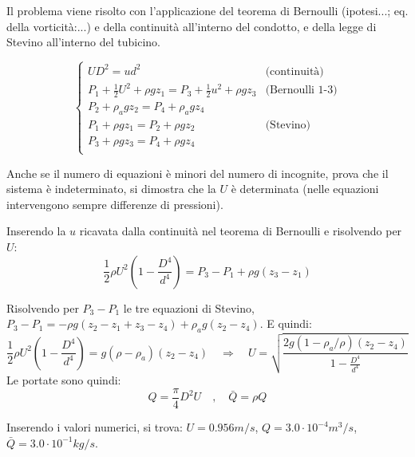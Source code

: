 \parttwo
Il problema viene risolto con l'applicazione del teorema di Bernoulli (ipotesi...; eq. della vorticità:...) e della continuità all'interno del condotto, e della legge di Stevino all'interno del tubicino.

\begin{equation}
\begin{cases}
 U D^2 = u d^2 & \text{(continuità)} \\
 P_1 + \frac{1}{2}U^2 + \rho g z_1 = P_3 + \frac{1}{2}u^2 + \rho g z_3 & \text{(Bernoulli 1-3)} \\
 P_2 + \rho_a g z_2 = P_4 + \rho_a g z_4 \\
 P_1 + \rho g z_1 = P_2 + \rho g z_2   & \text{(Stevino)} \\
 P_3 + \rho g z_3 = P_4 + \rho g z_4 \\
\end{cases}
\end{equation}

Anche se il numero di equazioni è minori del numero di incognite, prova che il sistema è indeterminato, si dimostra che la $U$ è determinata (nelle equazioni intervengono sempre differenze di pressioni).

Inserendo la $u$ ricavata dalla continuità nel teorema di Bernoulli e risolvendo per $U$:
\begin{equation}
  \frac{1}{2} \rho U^2 (1 - \frac{D^4}{d^4}) = P_3 - P_1 + \rho g (z_3 - z_1)
\end{equation}

Risolvendo per $P_3 - P_1$ le tre equazioni di Stevino, $P_3 - P_1 = - \rho g(z_2-z_1+z_3-z_4) + \rho_a g (z_2 - z_4)$.
E quindi: 
\begin{equation}
  \frac{1}{2} \rho U^2 (1 - \frac{D^4}{d^4}) = g (\rho - \rho_a) (z_2 - z_4) \quad
  \Rightarrow \quad U = \sqrt{\frac{2 g (1 - \rho_a/\rho) (z_2 - z_4)}{1 - \frac{D^4}{d^4}}}
\end{equation}
Le portate sono quindi:
\begin{equation}
 Q = \frac{\pi}{4} D^2 U \quad , \quad \bar{Q} = \rho Q
\end{equation}

Inserendo i valori numerici, si trova: $U = 0.956 m/s$, $Q = 3.0 \cdot 10^{-4} m^3/s$, $\bar{Q} = 3.0 \cdot 10^{-1} kg/s$.
